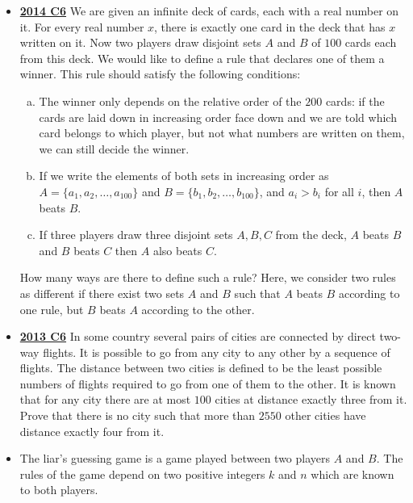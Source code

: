 \documentclass[11pt]{scrartcl}
\begin{document}
\begin{itemize}[leftmargin=*]
    Prove that there exist infinitely many positive integers that are not clean.
    
    \item \href{https://artofproblemsolving.com/community/c6h1113186p5083553}{\textbf{2014 C6}} We are given an infinite deck of cards, each with a real number on it. For every real number $x$, there is exactly one card in the deck that has $x$ written on it. Now two players draw disjoint sets $A$ and $B$ of $100$ cards each from this deck. We would like to define a rule that declares one of them a winner. This rule should satisfy the following conditions:
    \begin{enumerate}[(a)]
        \item The winner only depends on the relative order of the $200$ cards: if the cards are laid down in increasing order face down and we are told which card belongs to which player, but not what numbers are written on them, we can still decide the winner.
\item If we write the elements of both sets in increasing order as $A =\{ a_1 , a_2 , \dots, a_{100} \}$ and $B= \{ b_1 , b_2 , \dots , b_{100} \}$, and $a_i > b_i$ for all $i$, then $A$ beats $B$.
\item If three players draw three disjoint sets $A, B, C$ from the deck, $A$ beats $B$ and $B$ beats $C$ then $A$ also beats $C$.
    \end{enumerate}

How many ways are there to define such a rule? Here, we consider two rules as different if there exist two sets $A$ and $B$ such that $A$ beats $B$ according to one rule, but $B$ beats $A$ according to the other.
    \item \href{https://artofproblemsolving.com/community/c6h597136p3543443}{\textbf{2013 C6}} In some country several pairs of cities are connected by direct two-way flights. It is possible to go from any city to any other by a sequence of flights. The distance between two cities is defined to be the least possible numbers of flights required to go from one of them to the other. It is known that for any city there are at most $100$ cities at distance exactly three from it. Prove that there is no city such that more than $2550$ other cities have distance exactly four from it.
    \newpage
    
    \item {} The liar's guessing game is a game played between two players $A$ and $B$. The rules of the game depend on two positive integers $k$ and $n$ which are known to both players.


\end{itemize}
\end{document}
